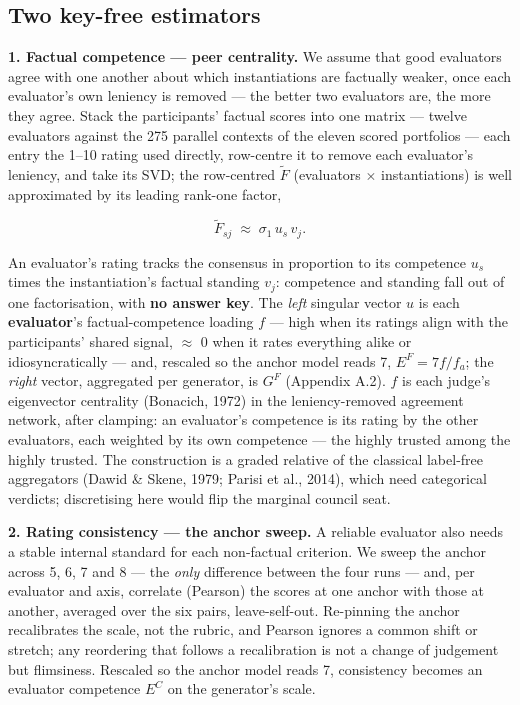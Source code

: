 \documentclass{article}
\begin{document}
\subsection{Two key-free estimators}\label{two-key-free-estimators}

\textbf{1. Factual competence --- peer centrality.} We assume that good evaluators agree with one another about which instantiations are factually weaker, once each evaluator's own leniency is removed --- the better two evaluators are, the more they agree. Stack the participants' factual scores into one matrix --- twelve evaluators against the 275 parallel contexts of the eleven scored portfolios --- each entry the 1--10 rating used directly, row-centre it to remove each evaluator's leniency, and take its SVD; the row-centred \(\tilde F\) (evaluators \ensuremath{\times} instantiations) is well approximated by its leading rank-one factor,

\[\tilde F_{sj} \;\approx\; \sigma_1\, u_s\, v_j . \tag{1}\]

An evaluator's rating tracks the consensus in proportion to its competence \(u_s\) times the instantiation's factual standing \(v_j\): competence and standing fall out of one factorisation, with \textbf{no answer key}. The \emph{left} singular vector \(u\) is each \textbf{evaluator}'s factual-competence loading \(f\) --- high when its ratings align with the participants' shared signal, \ensuremath{\approx} 0 when it rates everything alike or idiosyncratically --- and, rescaled so the anchor model reads 7, \(E^{F} = 7f/f_a\); the \emph{right} vector, aggregated per generator, is \(G^{F}\) (Appendix A.2). \(f\) is each judge's eigenvector centrality (Bonacich, 1972) in the leniency-removed agreement network, after clamping: an evaluator's competence is its rating by the other evaluators, each weighted by its own competence --- the highly trusted among the highly trusted. The construction is a graded relative of the classical label-free aggregators (Dawid \& Skene, 1979; Parisi et al., 2014), which need categorical verdicts; discretising here would flip the marginal council seat.

\textbf{2. Rating consistency --- the anchor sweep.} A reliable evaluator also needs a stable internal standard for each non-factual criterion. We sweep the anchor across 5, 6, 7 and 8 --- the \emph{only} difference between the four runs --- and, per evaluator and axis, correlate (Pearson) the scores at one anchor with those at another, averaged over the six pairs, leave-self-out. Re-pinning the anchor recalibrates the scale, not the rubric, and Pearson ignores a common shift or stretch; any reordering that follows a recalibration is not a change of judgement but flimsiness. Rescaled so the anchor model reads 7, consistency becomes an evaluator competence \(E^{C}\) on the generator's scale.
\end{document}
